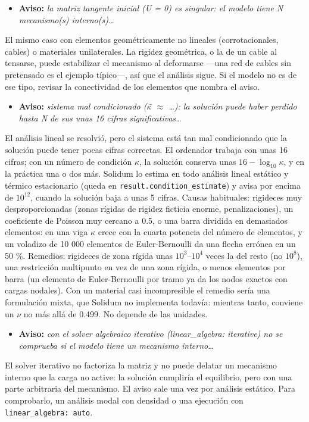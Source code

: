 \documentclass[11pt,oneside]{report}
\begin{document}
\begin{itemize}
  \item \textbf{Aviso:} \textit{la matriz tangente inicial (U = 0) es singular: el modelo tiene N mecanismo(s) interno(s)\ldots{}}
\end{itemize}
  El mismo caso con elementos geométricamente no lineales (corrotacionales, cables) o materiales unilaterales. La rigidez geométrica, o la de un cable al tensarse, puede estabilizar el mecanismo al deformarse ---una red de cables sin pretensado es el ejemplo típico---, así que el análisis sigue. Si el modelo no es de ese tipo, revisar la conectividad de los elementos que nombra el aviso.

\begin{itemize}
  \item \textbf{Aviso:} \textit{sistema mal condicionado (\ensuremath{\kappa}̃ \ensuremath{\approx} \ldots{}): la solución puede haber perdido hasta N de sus unas 16 cifras significativas\ldots{}}
\end{itemize}
  El análisis lineal se resolvió, pero el sistema está tan mal condicionado que la solución puede tener pocas cifras correctas. El ordenador trabaja con unas 16 cifras; con un número de condición \ensuremath{\kappa}, la solución conserva unas $16 - \log_{10}\kappa$, y en la práctica una o dos más. Solidum lo estima en todo análisis lineal estático y térmico estacionario (queda en \texttt{result.\allowbreak{}condition\_\allowbreak{}estimate}) y avisa por encima de $10^{12}$, cuando la solución baja a unas 5 cifras. Causas habituales: rigideces muy desproporcionadas (zonas rígidas de rigidez ficticia enorme, penalizaciones), un coeficiente de Poisson muy cercano a 0.5, o una barra dividida en demasiados elementos: en una viga \ensuremath{\kappa} crece con la cuarta potencia del número de elementos, y un voladizo de 10 000 elementos de Euler-Bernoulli da una flecha errónea en un 50 \%. Remedios: rigideces de zona rígida unas $10^3$--$10^4$ veces la del resto (no $10^8$), una restricción multipunto en vez de una zona rígida, o menos elementos por barra (un elemento de Euler-Bernoulli por tramo ya da los nodos exactos con cargas nodales). Con un material casi incompresible el remedio sería una formulación mixta, que Solidum no implementa todavía: mientras tanto, conviene un $\nu$ no más allá de 0.499. No depende de las unidades.

\begin{itemize}
  \item \textbf{Aviso:} \textit{con el solver algebraico iterativo (linear\_algebra: iterative) no se comprueba si el modelo tiene un mecanismo interno\ldots{}}
\end{itemize}
  El solver iterativo no factoriza la matriz y no puede delatar un mecanismo interno que la carga no active: la solución cumpliría el equilibrio, pero con una parte arbitraria del mecanismo. El aviso sale una vez por análisis estático. Para comprobarlo, un análisis modal con densidad o una ejecución con \texttt{linear\_\allowbreak{}algebra: auto}.
\end{document}
